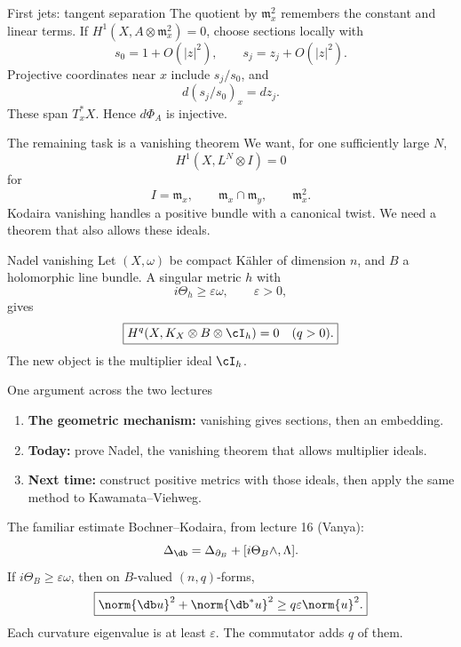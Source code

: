 \begin{frame}{First jets: tangent separation}
The quotient by \(\mathfrak m_x^2\) remembers the constant and linear terms.
If \(H^1(X,A\otimes\mathfrak m_x^2)=0\), choose sections locally with
\[
s_0=1+O(|z|^2),\qquad s_j=z_j+O(|z|^2).
\]
Projective coordinates near \(x\) include \(s_j/s_0\), and
\[
\boxed{d(s_j/s_0)_x=dz_j.}
\]
These span \(T_x^*X\). Hence \(d\Phi_A\) is injective.
\end{frame}

\begin{frame}{The remaining task is a vanishing theorem}
We want, for one sufficiently large \(N\),
\[
H^1(X,L^N\otimes I)=0
\]
for
\[
I=\mathfrak m_x,\qquad
\mathfrak m_x\cap\mathfrak m_y,\qquad
\mathfrak m_x^2.
\]
Kodaira vanishing handles a positive bundle with a canonical twist.
We need a theorem that also allows these ideals.
\end{frame}

\begin{frame}{Nadel vanishing}
Let \((X,\omega)\) be compact Kähler of dimension \(n\), and \(B\) a holomorphic line bundle.
A singular metric \(h\) with
\[
i\Theta_h\ge\varepsilon\omega,\qquad \varepsilon>0,
\]
gives
\[
\boxed{H^q(X,K_X\otimes B\otimes\cI_h)=0\quad(q>0).}
\]
The new object is the multiplier ideal \(\cI_h\).
\end{frame}

\begin{frame}{One argument across the two lectures}
\begin{enumerate}
\setlength{\itemsep}{15pt}
\item \textbf{The geometric mechanism:} vanishing gives sections, then an embedding.
\item \textbf{Today:} prove Nadel, the vanishing theorem that allows multiplier ideals.
\item \textbf{Next time:} construct positive metrics with those ideals, then apply the same method to Kawamata--Viehweg.
\end{enumerate}
\end{frame}

\begin{frame}{The familiar estimate}
Bochner--Kodaira, from lecture 16 (Vanya):
\[
\Delta_{\db}=\Delta_{\partial_B}+[i\Theta_B\wedge,\Lambda].
\]
If \(i\Theta_B\ge\varepsilon\omega\), then on \(B\)-valued \((n,q)\)-forms,
\[
\boxed{\norm{\db u}^2+\norm{\db^*u}^2
\ge q\varepsilon\norm{u}^2.}
\]
Each curvature eigenvalue is at least \(\varepsilon\).
The commutator adds \(q\) of them.
\end{frame}

